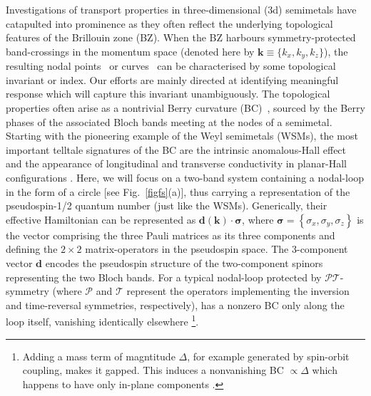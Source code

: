 \documentclass[aps,prb,onecolumn, footinbib, 10pt]{revtex4-2}
\newcommand{\bs}[1]{\boldsymbol{#1}}
\begin{document}
Investigations of transport properties in three-dimensional (3d) semimetals have catapulted into prominence as they often reflect the underlying topological features of the Brillouin zone (BZ). When the BZ harbours symmetry-protected band-crossings in the momentum space (denoted here by $\bs k \equiv \lbrace k_x, k_y, k_z \rbrace $), the resulting nodal points~\cite{burkov11_Weyl, yan17_topological, bernevig, grushin-multifold} or curves~\cite{balents-nodal, vortex-nrsm} can be characterised by some topological invariant or index. Our efforts are mainly directed at identifying meaningful response which will capture this invariant unambiguously.
The topological properties often arise as a nontrivial Berry curvature (BC)~\cite{xiao_review, *sundaram99_wavepacket,graf-Nband, *graf_thesis}, sourced by the Berry phases of the associated Bloch bands meeting at the nodes of a semimetal. Starting with the pioneering example of the Weyl semimetals (WSMs), the most important telltale signatures of the BC are the intrinsic anomalous-Hall effect~\cite{haldane04_berry,goswami13_axionic, burkov14_anomolous} and the appearance of longitudinal and transverse conductivity in planar-Hall configurations \cite{zhang16_linear, chen16_thermoelectric, nandy_2017_chiral, *nandy18_Berry, *ips-mwsm-floquet, amit_magneto, *das20_thermal, ips-kush-review, ips-ruiz, *ips-tilted, ips-rsw-ph, *ips-shreya, ips-spin1-ph, timm, *ips-exact-spin1, *ips-exact-kwn, * ips-exact-rsw, phe_nlsm, ips-nlsm-ph, *ips-exact-kwn}. Here, we will focus on a two-band system containing a nodal-loop in the form of a circle [see Fig.~\ref{figfs}(a)], thus carrying a representation of the pseudospin-1/2 quantum number (just like the WSMs). Generically, their effective Hamiltonian can be represented as $\boldsymbol{d} (\bm k) \cdot \boldsymbol \sigma$, where $ \boldsymbol{\sigma} = \left\lbrace \sigma_x,\sigma_y,\sigma_z\right \rbrace $ is the vector comprising the three Pauli matrices as its three components and defining the $2\times 2$ matrix-operators in the pseudospin space. The 3-component vector $\bs d$ encodes the pseudospin structure of the two-component spinors representing the two Bloch bands. For a typical nodal-loop protected by $\mathcal P \mathcal T$-symmetry (where $\mathcal P$ and $\mathcal T$ represent the operators implementing the inversion and time-reversal symmetries, respectively), has a nonzero BC only along the loop itself, vanishing identically elsewhere
\footnote{Adding a mass term of magntitude $\Delta $, for example generated by spin-orbit coupling, makes it gapped. This induces a nonvanishing BC $\propto \Delta$ which happens to have only in-plane components \cite{schnyder_nodal, yang1, yang_review_nlsm, chen_nlsm, ips-magnus, flores, phe_nlsm, claudia_nlsm, enke, ips-nlsm-ph}.}.
\end{document}

